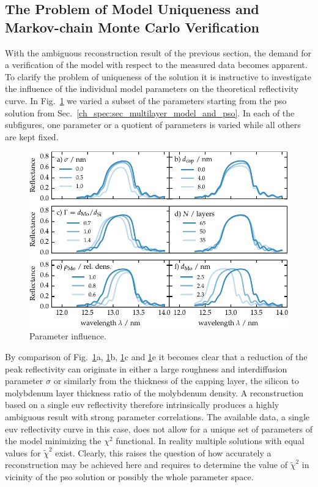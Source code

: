 \subsection{The Problem of Model Uniqueness and Markov-chain Monte Carlo Verification}
With the ambiguous reconstruction result of the previous section, the demand for a verification of the model with respect to the measured data becomes apparent. To clarify the problem of uniqueness of the solution it is instructive to investigate the influence of the individual model parameters on the theoretical reflectivity curve. In Fig.~\ref{ch_spec:fig_mo_si_parameter_influence} we varied a subset of the parameters starting from the \gls{pso} solution from Sec.~\ref{ch_spec:sec_multilayer_model_and_pso}. In each of the subfigures, one parameter or a quotient of parameters is varied while all others are kept fixed.
\begin{figure}[htbp]
\centering
\includegraphics{img/parameter_influence}
\caption{Parameter influence.}
\label{ch_spec:fig_mo_si_parameter_influence}
\end{figure}
By comparison of Fig.~\ref{ch_spec:fig_mo_si_parameter_influence}a, \ref{ch_spec:fig_mo_si_parameter_influence}b, \ref{ch_spec:fig_mo_si_parameter_influence}c and \ref{ch_spec:fig_mo_si_parameter_influence}e it becomes clear that a reduction of the peak reflectivity can originate in either a large roughness and interdiffusion parameter $\sigma$ or similarly from the thickness of the capping layer, the silicon to molybdenum layer thickness ratio of the molybdenum density. A reconstruction based on a single \gls{euv} reflectivity therefore intrinsically produces a highly ambiguous result with strong parameter correlations. The available data, a single \gls{euv} reflectivity curve in this case, does not allow for a unique set of parameters of the model minimizing the $\chi^2$ functional. In reality multiple solutions with equal values for $\tilde{\chi}^2$ exist. Clearly, this raises the question of how accurately a reconstruction may be achieved here and requires to determine the value of $\tilde{\chi}^2$ in vicinity of the \gls{pso} solution or possibly the whole parameter space.


